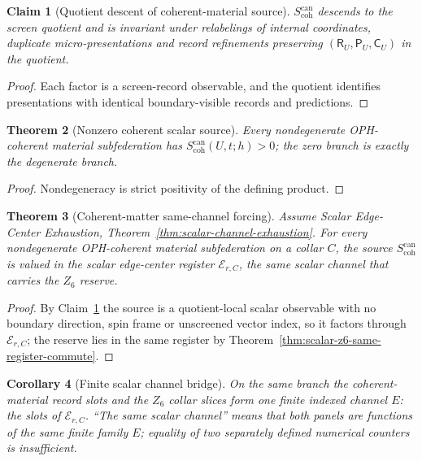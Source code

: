 \documentclass[11pt]{article}
\newtheorem{theorem}{Theorem}[section]
\newtheorem{corollary}[theorem]{Corollary}
\newtheorem{claim}[theorem]{Claim}
\theoremstyle{remark}
\theoremstyle{plain}
\begin{document}
\begin{claim}[Quotient descent of coherent-material source]
\label{lem:coherent-material-source-quotient-descent}
\(S_{\mathrm{coh}}^{\mathrm{can}}\) descends to the screen quotient and is
invariant under relabelings of internal coordinates, duplicate
micro-presentations and record refinements preserving
\((\mathsf R_U,\mathsf P_U,\mathsf C_U)\) in the quotient.
\end{claim}

\begin{proof}
Each factor is a screen-record observable, and the quotient identifies
presentations with identical boundary-visible records and predictions.
\end{proof}

\begin{theorem}[Nonzero coherent scalar source]
\label{thm:nonzero-coherent-scalar-source}
Every nondegenerate OPH-coherent material subfederation has
\(S_{\mathrm{coh}}^{\mathrm{can}}(U,t;h)>0\); the zero branch is exactly the
degenerate branch.
\end{theorem}

\begin{proof}
Nondegeneracy is strict positivity of the defining product.
\end{proof}

\begin{theorem}[Coherent-matter same-channel forcing]
\label{thm:coherent-matter-same-channel-forcing}
Assume Scalar Edge-Center Exhaustion,
Theorem~\ref{thm:scalar-channel-exhaustion}. For every nondegenerate
OPH-coherent material subfederation on a collar \(C\), the source
\(S_{\mathrm{coh}}^{\mathrm{can}}\) is valued in the scalar edge-center
register \(\mathcal E_{r,C}\), the same scalar channel that carries the
\(Z_6\) reserve.
\end{theorem}

\begin{proof}
By Claim~\ref{lem:coherent-material-source-quotient-descent} the source is a
quotient-local scalar observable with no boundary direction, spin frame or
unscreened vector index, so it factors through \(\mathcal E_{r,C}\); the
reserve lies in the same register by
Theorem~\ref{thm:scalar-z6-same-register-commute}.
\end{proof}

\begin{corollary}[Finite scalar channel bridge]
\label{cor:finite-scalar-channel-bridge}
On the same branch the coherent-material record slots and the \(Z_6\)
collar slices form one finite indexed channel \(E\): the slots of
\(\mathcal E_{r,C}\). ``The same scalar channel'' means that both panels are
functions of the same finite family \(E\); equality of two separately
defined numerical counters is insufficient.
\end{corollary}
\end{document}
